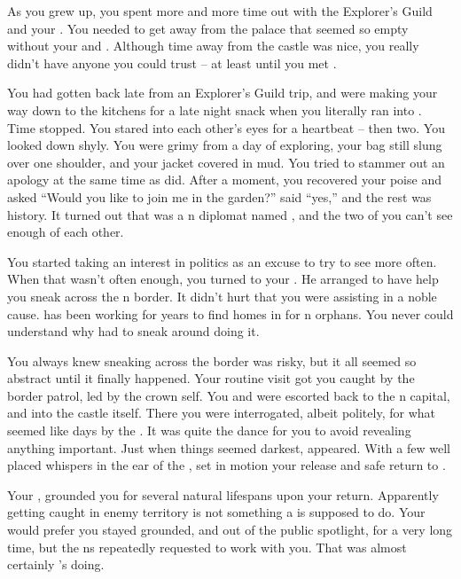 \documentclass[char]{NeptuneBall}
\begin{document}
As you grew up, you spent more and more time out with the Explorer's Guild and your \cPlant{\uncle}. You needed to get away from the palace that seemed so empty without your \cQueen{\parent} and \cAriel{\sibling}. Although time away from the castle was nice, you really didn't have anyone you could trust -- at least until you met \emph{\cDiplomat{\them}}.

You had gotten back late from an Explorer's Guild trip, and were making your way down to the kitchens for a late night snack when you literally ran into \emph{\cDiplomat{\them}}. Time stopped. You stared into each other's eyes for a heartbeat -- then two. You looked down shyly. You were grimy from a day of exploring, your bag still slung over one shoulder, and your jacket covered in mud. You tried to stammer out an apology at the same time as \cDiplomat{\they} did. After a moment, you recovered your poise and asked ``Would you like to join me in the garden?'' \cDiplomat{\They} said ``yes,'' and the rest was history.  It turned out that \cDiplomat{\they} was a \pPacifica{}n diplomat named \cDiplomat{}, and the two of you can't see enough of each other. 

You started taking an interest in politics as an excuse to try to see \cDiplomat{\them} more often. When that wasn't often enough, you turned to your \cPlant{\uncle}. He arranged to have \cPriest{} help you sneak across  the \pPacifica{}n border. It didn't hurt that you were assisting in a noble cause. \cPriest{} has been working for years to find homes in \pPacifica{} for \pAtlantis{}n orphans. You never could understand why \cPriest{\they} had to sneak around doing it.

You always knew sneaking across the border was risky, but it all seemed so abstract until it finally happened. Your routine visit got you caught by the border patrol, led by the crown \cPrince{\Prince} \cPrince{\them}self. You and \cPriest{} were escorted back to the \pPacifica{}n capital, and into the castle itself. There you were interrogated, albeit politely, for what seemed like days by the \cPrince{\prince}. It was quite the dance for you to avoid revealing anything important. Just when things seemed darkest, \cDiplomat{} appeared. With a few well placed whispers in the ear of the \cPrince{\Prince}, \cDiplomat{\they} set in motion your release and safe return to \pAtlantis{}.

Your \cKing{\parent}, \cKing{\King} \cKing{} grounded you for several natural lifespans upon your return. Apparently getting caught in enemy territory is not something a \cPrincess{\prince} is supposed to do. Your \cKing{\parent} would prefer you stayed grounded, and out of the public spotlight, for a very long time, but the \pPacifica{}ns repeatedly requested to work with you. That was almost certainly \cDiplomat{}'s doing. 
\end{document}
